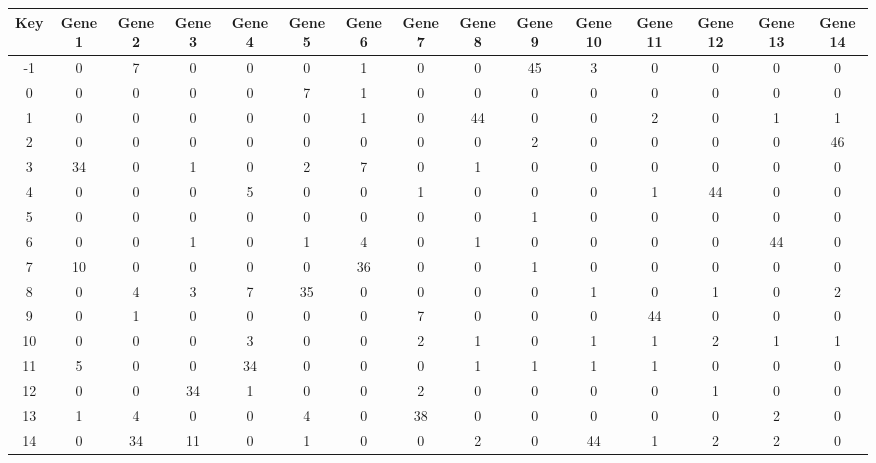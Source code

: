\begin{tabular}{|c|c|c|c|c|c|c|c|c|c|c|c|c|c|c|}
\hline
Key & Gene 1 & Gene 2 & Gene 3 & Gene 4 & Gene 5 & Gene 6 & Gene 7 & Gene 8 & Gene 9 & Gene 10 & Gene 11 & Gene 12 & Gene 13 & Gene 14 \\
\hline
-1 & 0 & 7 & 0 & 0 & 0 & 1 & 0 & 0 & 45 & 3 & 0 & 0 & 0 & 0 \\
0 & 0 & 0 & 0 & 0 & 7 & 1 & 0 & 0 & 0 & 0 & 0 & 0 & 0 & 0 \\
1 & 0 & 0 & 0 & 0 & 0 & 1 & 0 & 44 & 0 & 0 & 2 & 0 & 1 & 1 \\
2 & 0 & 0 & 0 & 0 & 0 & 0 & 0 & 0 & 2 & 0 & 0 & 0 & 0 & 46 \\
3 & 34 & 0 & 1 & 0 & 2 & 7 & 0 & 1 & 0 & 0 & 0 & 0 & 0 & 0 \\
4 & 0 & 0 & 0 & 5 & 0 & 0 & 1 & 0 & 0 & 0 & 1 & 44 & 0 & 0 \\
5 & 0 & 0 & 0 & 0 & 0 & 0 & 0 & 0 & 1 & 0 & 0 & 0 & 0 & 0 \\
6 & 0 & 0 & 1 & 0 & 1 & 4 & 0 & 1 & 0 & 0 & 0 & 0 & 44 & 0 \\
7 & 10 & 0 & 0 & 0 & 0 & 36 & 0 & 0 & 1 & 0 & 0 & 0 & 0 & 0 \\
8 & 0 & 4 & 3 & 7 & 35 & 0 & 0 & 0 & 0 & 1 & 0 & 1 & 0 & 2 \\
9 & 0 & 1 & 0 & 0 & 0 & 0 & 7 & 0 & 0 & 0 & 44 & 0 & 0 & 0 \\
10 & 0 & 0 & 0 & 3 & 0 & 0 & 2 & 1 & 0 & 1 & 1 & 2 & 1 & 1 \\
11 & 5 & 0 & 0 & 34 & 0 & 0 & 0 & 1 & 1 & 1 & 1 & 0 & 0 & 0 \\
12 & 0 & 0 & 34 & 1 & 0 & 0 & 2 & 0 & 0 & 0 & 0 & 1 & 0 & 0 \\
13 & 1 & 4 & 0 & 0 & 4 & 0 & 38 & 0 & 0 & 0 & 0 & 0 & 2 & 0 \\
14 & 0 & 34 & 11 & 0 & 1 & 0 & 0 & 2 & 0 & 44 & 1 & 2 & 2 & 0 \\
\hline
\end{tabular}